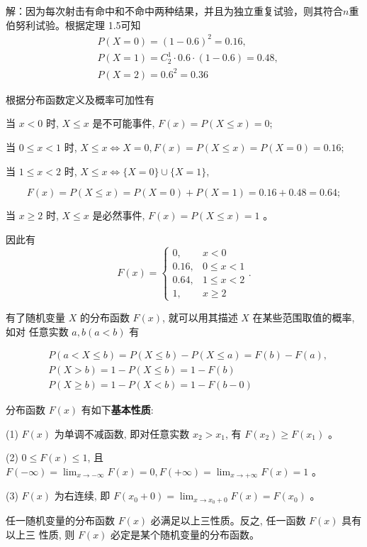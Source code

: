 \documentclass{beamer}
\begin{document}
	\begin{frame}
		解：因为每次射击有命中和不命中两种结果，并且为独立重复试验，则其符合$n$重伯努利试验。根据定理 1.5可知
		\begin{align}
			& P(X=0)=(1-0.6)^{2}=0.16, \\
			& P(X=1)=C_{2}^{1} \cdot 0.6 \cdot(1-0.6)=0.48, \\
			& P(X=2)=0.6^{2}=0.36
		\end{align}
		
		根据分布函数定义及概率可加性有
		
		当 $x<0$ 时, $X \leqslant x$ 是不可能事件, $F(x)=P(X \leqslant x)=0$;
		
		当 $0 \leqslant x<1$ 时, $X \leqslant x \Leftrightarrow X=0, F(x)=P(X \leqslant x)=P(X=0)=0.16$;
		
		当 $1 \leqslant x<2$ 时, $X \leqslant x \Leftrightarrow\{X=0\} \cup\{X=1\}$,
		
		$$
		F(x)=P(X \leqslant x)=P(X=0)+P(X=1)=0.16+0.48=0.64 ;
		$$
		
		当 $x \geqslant 2$ 时, $X \leqslant x$ 是必然事件, $F(x)=P(X \leqslant x)=1$ 。
		
	\end{frame}
	
	\begin{frame}
		因此有
		$$
		F(x)=\left\{\begin{array}{cc}
			0, & x<0 \\
			0.16, & 0 \leqslant x<1 \\
			0.64, & 1 \leqslant x<2 \\
			1, & x \geqslant 2
		\end{array} .\right.
		$$
	\end{frame}
	
	\begin{frame}
		有了随机变量 $X$ 的分布函数 $F(x)$, 就可以用其描述 $X$ 在某些范围取值的概率, 如对 任意实数 $a, b(a<b)$ 有
		
		$$
		\begin{aligned}
			& P(a<X \leqslant b)=P(X \leqslant b)-P(X \leqslant a)=F(b)-F(a), \\
			& P(X>b)=1-P(X \leqslant b)=1-F(b) \\
			& P(X \geqslant b)=1-P(X<b)=1-F(b-0)
		\end{aligned}
		$$
	\end{frame}
		
	\begin{frame}
		分布函数 $F(x)$ 有如下\textbf{基本性质}:
		
		(1) $F(x)$ 为单调不减函数, 即对任意实数 $x_{2}>x_{1}$, 有 $F\left(x_{2}\right) \geqslant F\left(x_{1}\right)$ 。
		
		
		(2) $0 \leqslant F(x) \leqslant 1$, 且 $F(-\infty)=\lim _{x \rightarrow-\infty} F(x)=0, F(+\infty)=\lim _{x \rightarrow+\infty} F(x)=1$ 。
		
		(3) $F(x)$ 为右连续, 即 $F\left(x_{0}+0\right)=\lim _{x \rightarrow x_{0}+0} F(x)=F\left(x_{0}\right)$ 。
		
		任一随机变量的分布函数 $F(x)$ 必满足以上三性质。反之, 任一函数 $F(x)$ 具有以上三 性质, 则 $F(x)$ 必定是某个随机变量的分布函数。
	\end{frame}
	
\end{document}
